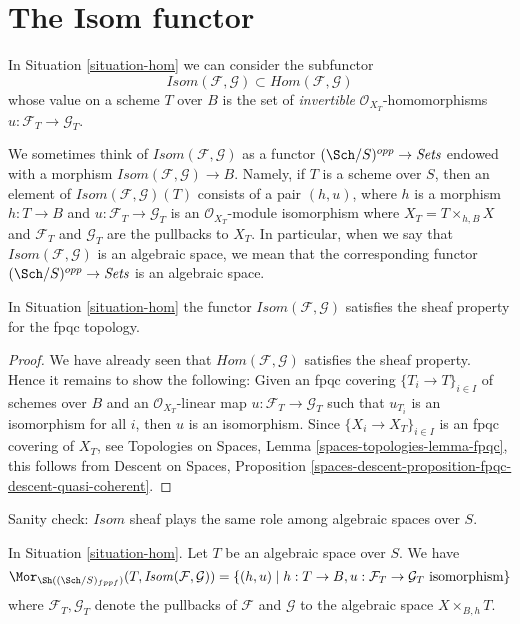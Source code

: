 \section{The Isom functor}
\label{section-isom}

\noindent
In Situation \ref{situation-hom} we can consider the subfunctor
$$
\mathit{Isom}(\mathcal{F}, \mathcal{G}) \subset
\mathit{Hom}(\mathcal{F}, \mathcal{G})
$$
whose value on a scheme $T$ over $B$ is the set of {\it invertible}
$\mathcal{O}_{X_T}$-homomorphisms $u : \mathcal{F}_T \to \mathcal{G}_T$.

\medskip\noindent
We sometimes think of
$\mathit{Isom}(\mathcal{F}, \mathcal{G})$ as a functor
$(\Sch/S)^{opp} \to \textit{Sets}$
endowed with a morphism
$\mathit{Isom}(\mathcal{F}, \mathcal{G}) \to B$.
Namely, if $T$ is a scheme over $S$, then an element of
$\mathit{Isom}(\mathcal{F}, \mathcal{G})(T)$ consists of a pair
$(h, u)$, where $h$ is a morphism $h : T \to B$ and
$u : \mathcal{F}_T \to \mathcal{G}_T$ is an $\mathcal{O}_{X_T}$-module
isomorphism
where $X_T = T \times_{h, B} X$ and $\mathcal{F}_T$ and $\mathcal{G}_T$
are the pullbacks to $X_T$. In particular, when we say
that $\mathit{Isom}(\mathcal{F}, \mathcal{G})$ is an algebraic space,
we mean that the corresponding functor
$(\Sch/S)^{opp} \to \textit{Sets}$ is an algebraic space.

\begin{lemma}
\label{lemma-isom-sheaf}
In Situation \ref{situation-hom} the functor
$\mathit{Isom}(\mathcal{F}, \mathcal{G})$ 
satisfies the sheaf property for the fpqc topology.
\end{lemma}

\begin{proof}
We have already seen that $\mathit{Hom}(\mathcal{F}, \mathcal{G})$
satisfies the sheaf property. Hence it remains to show the following:
Given an fpqc covering $\{T_i \to T\}_{i \in I}$ of schemes over $B$
and an $\mathcal{O}_{X_T}$-linear map
$u : \mathcal{F}_T \to \mathcal{G}_T$ such that
$u_{T_i}$ is an isomorphism for all $i$, then $u$ is an isomorphism.
Since $\{X_i \to X_T\}_{i \in I}$ is an fpqc covering of $X_T$, see
Topologies on Spaces, Lemma \ref{spaces-topologies-lemma-fpqc},
this follows from
Descent on Spaces, Proposition
\ref{spaces-descent-proposition-fpqc-descent-quasi-coherent}.
\end{proof}

\noindent
Sanity check: $\mathit{Isom}$ sheaf plays the same role among algebraic spaces
over $S$.

\begin{lemma}
\label{lemma-extend-isom-to-spaces}
In Situation \ref{situation-hom}. Let $T$ be an algebraic space over $S$.
We have
$$
\Mor_{\Sh((\Sch/S)_{fppf})}(T, \mathit{Isom}(\mathcal{F}, \mathcal{G})) =
\{(h, u) \mid
h : T \to B, u : \mathcal{F}_T \to \mathcal{G}_T\text{ isomorphism}\}
$$
where $\mathcal{F}_T, \mathcal{G}_T$ denote the pullbacks of $\mathcal{F}$
and $\mathcal{G}$ to the algebraic space $X \times_{B, h} T$.
\end{lemma}

